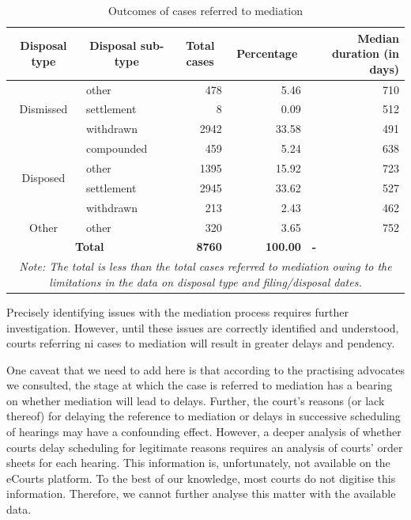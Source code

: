 \documentclass[12pt,a4paper]{article}
\begin{document}
\begin{table}[!ht]
\caption{Outcomes of cases referred to mediation}
\label{tab:mediation}
\centering
\footnotesize
\begin{tabular}{clrrr}
\toprule
\textbf{Disposal type} & \multicolumn{1}{c}{\textbf{Disposal sub-type}} & \multicolumn{1}{c}{\textbf{Total cases}} & \multicolumn{1}{c}{\textbf{Percentage}} & \multicolumn{1}{p{3cm}}{\textbf{Median duration (in days)}} \\
\midrule %
\multirow{3}{*}{Dismissed} & other & 478 & 5.46 & 710 \\
& settlement & 8 & 0.09 & 512 \\
& withdrawn & 2942 & 33.58 & 491 \\
\midrule
\multirow{4}{*}{Disposed} & compounded & 459 & 5.24 & 638 \\
& other & 1395 & 15.92 & 723 \\
& settlement & 2945 & 33.62 & 527 \\
& withdrawn & 213 & 2.43 & 462 \\
\midrule
Other & other & 320 & 3.65 & 752 \\
\midrule
\multicolumn{2}{c}{\textbf{Total}} & \textbf{8760} & \textbf{100.00} & \multicolumn{1}{l}{\textbf{-}} \\
\bottomrule \multicolumn{5}{p{11cm}}{{\footnotesize \emph{Note:
The total is less than the total cases referred to mediation owing to the limitations in the data on disposal type and filing/disposal dates.}}}
\end{tabular}
\end{table}

Precisely identifying issues with the mediation process requires further investigation. However, until these issues are correctly identified and understood, courts referring \gls{ni} cases to mediation will result in greater delays and pendency.

One caveat that we need to add here is that according to the practising advocates we consulted, the stage at which the case is referred to mediation has a bearing on whether mediation will lead to delays. Further, the court's reasons (or lack thereof) for delaying the reference to mediation or delays in successive scheduling of hearings may have a confounding effect. However, a deeper analysis of whether courts delay scheduling for legitimate reasons requires an analysis of courts' order sheets for each hearing. This information is, unfortunately, not available on the eCourts platform. To the best of our knowledge, most courts do not digitise this information. Therefore, we cannot further analyse this matter with the available data.
\end{document}
